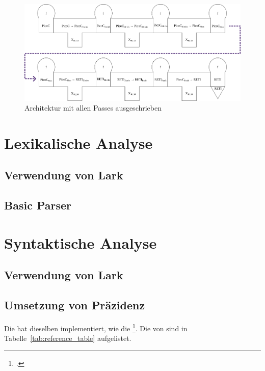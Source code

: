 \begin{figure}[H]
  \centering
  \includegraphics[width=\linewidth]{./figures/passes.png}
  \caption{Architektur mit allen Passes ausgeschrieben}
\end{figure}

\section{Lexikalische Analyse}
\subsection{Verwendung von Lark}
\subsection{Basic Parser}
\section{Syntaktische Analyse}
\subsection{Verwendung von Lark}
\subsection{Umsetzung von Präzidenz}
Die  hat dieselben  implementiert, wie die  \footcite{noauthor_c_nodate}. Die  von  sind in Tabelle~\ref{tab:reference_table} aufgelistet.

